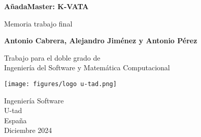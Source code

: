 \documentclass{report}
\begin{document}
\begin{titlepage}
    \begin{center}
        \vspace*{1cm}
 
        \Large\textbf{AñadaMaster: K-VATA}
 
        \vspace{0.5cm}
            Memoria trabajo final
        \vspace{1.5cm}
 
        \textbf{Antonio Cabrera, Alejandro Jiménez y Antonio Pérez}
 
        \vfill
             
        Trabajo para el doble grado de\\
        Ingeniería del Software y Matemática Computacional\\
             
        \vspace{0.8cm}
      
        \texttt{[image: figures/logo u-tad.png]}
             
        Ingeniería Software\\
        U-tad\\
        España\\
        Diciembre 2024
             
    \end{center}
 \end{titlepage}

\tableofcontents

\listoffigures








\end{document}
